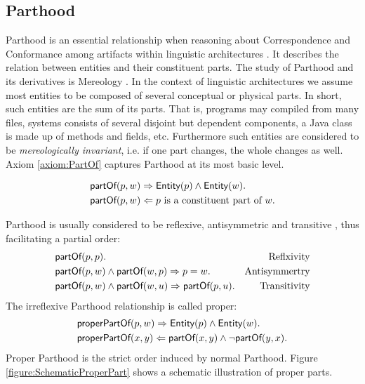 \subsection{Parthood}
\label{subsection:Parthood}
\Gls{Parthood} is an essential relationship when reasoning about \gls{Correspondence} and \gls{Conformance} among artifacts within linguistic architectures \cite{DBLP:conf/sle/Lammel16} \cite{HeinzLV17}.
It describes the relation between entities and their constituent parts.
The study of \gls{Parthood} and its derivatives is \gls{Mereology} \cite{DBLP:journals/dke/Varzi96} \cite{SEP:Mereology}.
In the context of linguistic architectures we assume most entities to be
composed of several conceptual or physical parts.
In short, such entities are the sum of its parts.
That is, programs may compiled from many files, systems consists of several disjoint but dependent components, a \gls{Java} class is made up of methods and fields, etc.
Furthermore such entities are considered to be \textit{mereologically invariant}, i.e. if one part changes, the whole changes as well. 
Axiom \ref{axiom:PartOf} captures \gls{Parthood} at its most basic level.
\begin{axiom}[\partOf]
\label{axiom:PartOf}
\begin{align*}
&\textsf{partOf}(p,w)
\Rightarrow
\textsf{Entity}(p) \wedge \textsf{Entity}(w).\\
&\textsf{partOf}(p,w)
\Leftarrow
p \text{ is a constituent part of } w.
\end{align*}
\end{axiom}
\Gls{Parthood} is usually considered to be reflexive, antisymmetric and transitive \cite{DBLP:journals/dke/Varzi96} \cite{SEP:Mereology}, thus facilitating a partial order:
\begin{align*}
&\textsf{partOf}(p,p). &\text{Reflxivity}\\
&\textsf{partOf}(p,w) \wedge \textsf{partOf}(w,p)
\Rightarrow
p = w. &\text{Antisymmertry}\\
&\textsf{partOf}(p,w) \wedge \textsf{partOf}(w,u)
\Rightarrow 
\textsf{partOf}(p,u). &\text{Transitivity}
\end{align*}
The irreflexive \gls{Parthood} relationship is called proper:
\begin{align*}
&\textsf{properPartOf}(p,w)
\Rightarrow
\textsf{Entity}(p) \wedge \textsf{Entity}(w).\\
&\textsf{properPartOf}(x,y)
\Leftarrow
\textsf{partOf}(x,y) \wedge \neg \textsf{partOf}(y,x).
\end{align*}
Proper \gls{Parthood} is the strict order induced by normal \gls{Parthood}.
Figure \ref{figure:SchematicProperPart} shows a schematic illustration of proper parts.
